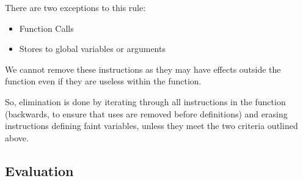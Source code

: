 \documentclass[12pt]{article}
\begin{document}
There are two exceptions to this rule:
\begin{itemize}
\item Function Calls
\item Stores to global variables or arguments
\end{itemize}
We cannot remove these instructions as they may have effects outside the function even if they are useless within the function.

So, elimination is done by iterating through all instructions in the function (backwards, to ensure that uses are removed before definitions) and erasing instructions defining faint variables, unless they meet the two criteria outlined above.

\subsection{Evaluation}
\end{document}
